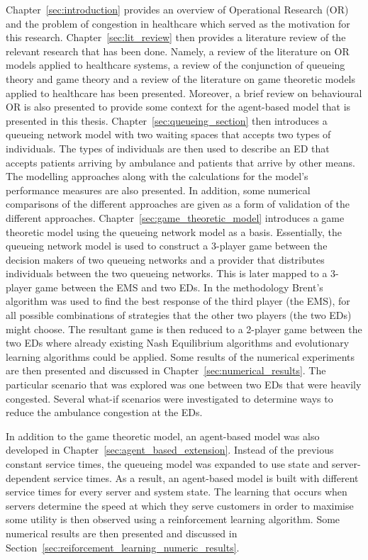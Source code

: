 Chapter~\ref{sec:introduction} provides an overview of Operational Research
(OR) and the problem of congestion in healthcare which served as the
motivation for this research.
Chapter~\ref{sec:lit_review} then provides a literature review of the
relevant research that has been done.
Namely, a review of the literature on OR models applied to healthcare
systems, a review of the conjunction of queueing theory and game theory and a
review of the literature on game theoretic models applied to healthcare has
been presented.
Moreover, a brief review on behavioural OR is also presented to provide some
context for the agent-based model that is presented in this thesis.
Chapter~\ref{sec:queueing_section} then introduces a queueing network model
with two waiting spaces that accepts two types of individuals.
The types of individuals are then used to describe an ED that accepts
patients arriving by ambulance and patients that arrive by other means.
The modelling approaches along with the calculations for the model's
performance measures are also presented.
In addition, some numerical comparisons of the different approaches are
given as a form of validation of the different approaches.
Chapter~\ref{sec:game_theoretic_model} introduces a game theoretic model
using the queueing network model as a basis.
Essentially, the queueing network model is used to construct a 3-player game
between the decision makers of two queueing networks and a provider that
distributes individuals between the two queueing networks.
This is later mapped to a 3-player game between the EMS and two EDs.
In the methodology Brent's algorithm was used to find the best response
of the third player (the EMS), for all possible combinations of strategies that
the other two players (the two EDs) might choose.
The resultant game is then reduced to a 2-player game between the two EDs
where already existing Nash Equilibrium algorithms and evolutionary learning
algorithms could be applied.
Some results of the numerical experiments are then presented and discussed in
Chapter~\ref{sec:numerical_results}.
The particular scenario that was explored was one between two EDs that
were heavily congested.
Several what-if scenarios were investigated to determine ways to reduce the
ambulance congestion at the EDs.

In addition to the game theoretic model, an agent-based model was also
developed in Chapter~\ref{sec:agent_based_extension}.
Instead of the previous constant service times, the queueing model was expanded
to use state and server-dependent service times.
As a result, an agent-based model is built with different service times for
every server and system state.
The learning that occurs when servers determine the speed at which they serve
customers in order to maximise some utility is then observed using a
reinforcement learning algorithm.
Some numerical results are then presented and discussed in
Section~\ref{sec:reiforcement_learning_numeric_results}.

